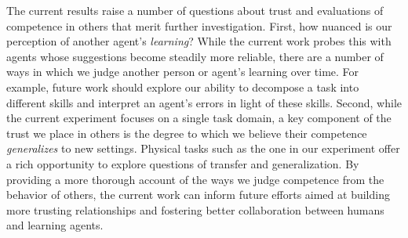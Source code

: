 \documentclass[10pt,letterpaper]{article}
\begin{document}
The current results raise a number of questions about trust and evaluations of competence in others that merit further investigation. First, how nuanced is our perception of another agent's \textit{learning}? While the current work probes this with agents whose suggestions become steadily more reliable, there are a number of ways in which we judge another person or agent's learning over time. For example, future work should explore our ability to decompose a task into different skills and interpret an agent's errors in light of these skills. Second, while the current experiment focuses on a single task domain, a key component of the trust we place in others is the degree to which we believe their competence \textit{generalizes} to new settings. Physical tasks such as the one in our experiment offer a rich opportunity to explore questions of transfer and generalization. By providing a more thorough account of the ways we judge competence from the behavior of others, the current work can inform future efforts aimed at building more trusting relationships and fostering better collaboration between humans and learning agents.










\setlength{\bibleftmargin}{.125in}
\setlength{\bibindent}{-\bibleftmargin}
\typeout{} %

\end{document}
